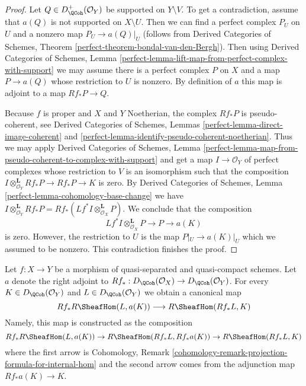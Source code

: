 \begin{proof}
Let $Q \in D^+_\QCoh(\mathcal{O}_Y)$ be supported on $Y \setminus V$.
To get a contradiction, assume that $a(Q)$ is not supported on
$X \setminus U$. Then we can find a perfect complex $P_U$ on $U$
and a nonzero map $P_U \to a(Q)|_U$ (follows from
Derived Categories of Schemes, Theorem
\ref{perfect-theorem-bondal-van-den-Bergh}). Then using
Derived Categories of Schemes, Lemma
\ref{perfect-lemma-lift-map-from-perfect-complex-with-support}
we may assume there is a perfect complex $P$ on $X$ and a map
$P \to a(Q)$ whose restriction to $U$ is nonzero.
By definition of $a$ this map
is adjoint to a map $Rf_*P \to Q$.

\medskip\noindent
Because $f$ is proper and $X$ and $Y$ Noetherian, the complex
$Rf_*P$ is pseudo-coherent, see
Derived Categories of Schemes, Lemmas
\ref{perfect-lemma-direct-image-coherent} and
\ref{perfect-lemma-identify-pseudo-coherent-noetherian}.
Thus we may apply
Derived Categories of Schemes, Lemma
\ref{perfect-lemma-map-from-pseudo-coherent-to-complex-with-support}
and get a map $I \to \mathcal{O}_Y$ of perfect complexes
whose restriction to $V$ is an isomorphism such that the composition
$I \otimes^\mathbf{L}_{\mathcal{O}_Y} Rf_*P \to Rf_*P \to K$ is zero.
By Derived Categories of Schemes, Lemma
\ref{perfect-lemma-cohomology-base-change}
we have $I \otimes^\mathbf{L}_{\mathcal{O}_Y} Rf_*P =
Rf_*(Lf^*I \otimes^\mathbf{L}_{\mathcal{O}_X} P)$.
We conclude that the composition
$$
Lf^*I \otimes^\mathbf{L}_{\mathcal{O}_X} P \to P \to a(K)
$$
is zero. However, the restriction to $U$ is the map
$P|_U \to a(K)|_U$ which we assumed to be nonzero.
This contradiction finishes the proof.
\end{proof}

\noindent
Let $f : X \to Y$ be a morphism of quasi-separated and quasi-compact
schemes. Let $a$ denote the right adjoint to
$Rf_* : D_\QCoh(\mathcal{O}_X) \to D_\QCoh(\mathcal{O}_Y)$. For every
$K \in D_\QCoh(\mathcal{O}_Y)$ and $L \in D_\QCoh(\mathcal{O}_Y)$
we obtain a canonical map
\begin{equation}
\label{equation-sheafy-trace}
Rf_*R\SheafHom(L, a(K)) \longrightarrow R\SheafHom(Rf_*L, K)
\end{equation}
Namely, this map is constructed as the composition
$$
Rf_*R\SheafHom(L, a(K)) \to R\SheafHom(Rf_*L, Rf_*a(K))
\to R\SheafHom(Rf_*L, K)
$$
where the first arrow is 
Cohomology, Remark
\ref{cohomology-remark-projection-formula-for-internal-hom}
and the second arrow comes from the adjunction map $Rf_*a(K) \to K$.

